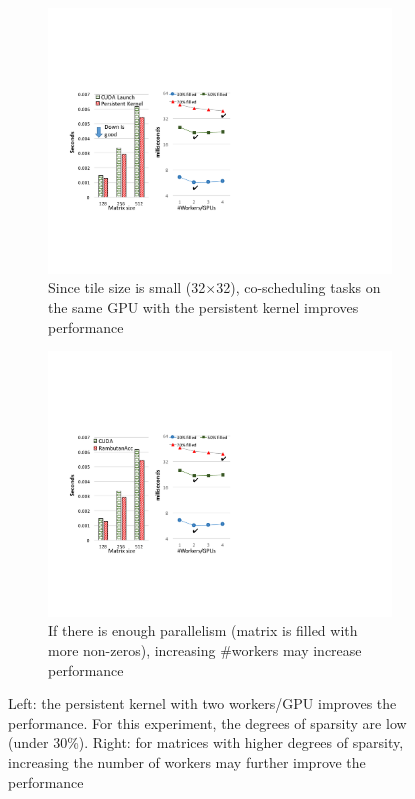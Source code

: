 \begin{figure}[htb]
\centering
\begin{subfigure}{0.25\textwidth}
\includegraphics[width=\textwidth]{figures/choleskyScheResults.pdf}
\caption{Since tile size is small (32$\times$32), co-scheduling tasks on the same GPU with the persistent kernel improves performance}
\label{choleskySche}
\end{subfigure}
\begin{subfigure}{0.222\textwidth}
\includegraphics[width=\textwidth]{figures/nWorkers.pdf}
\caption{If there is enough parallelism (matrix is filled with more non-zeros), increasing \#workers may increase performance}
\label{fig:nWorkers}
\end{subfigure}
\caption{Left: the persistent kernel with two workers/GPU improves the performance. For this experiment, the degrees of sparsity are low (under 30\%). Right: for matrices with higher degrees of sparsity, increasing the number of workers  may further improve the performance}
\label{fig:coarseFine}
\end{figure}

